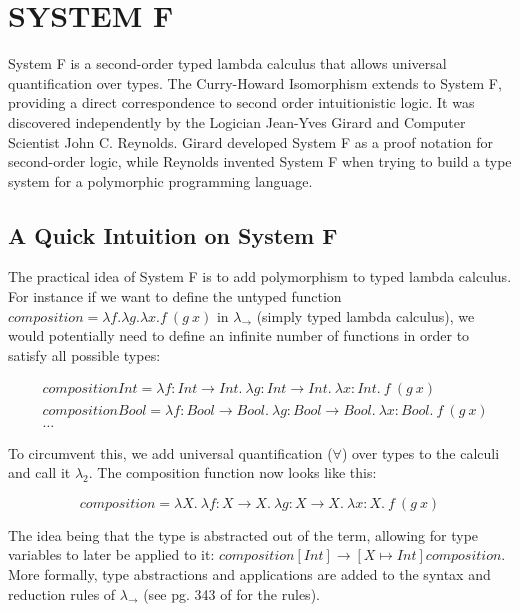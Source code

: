 \chapter{SYSTEM F} \label{ch:systemf}
System F is a second-order typed lambda calculus that allows universal quantification over types. The Curry-Howard Isomorphism extends to System F, providing a direct correspondence to second order intuitionistic logic. It was discovered independently by the Logician Jean-Yves Girard and Computer Scientist John C. Reynolds. Girard developed System F as a proof notation for second-order logic, while Reynolds invented System F when trying to build a type system for a polymorphic programming language. \cite{CHnotes}

\section{A Quick Intuition on System F}
The practical idea of System F is to add polymorphism to typed lambda calculus. For instance if we want to define the untyped function $composition = \lambda f. \lambda g. \lambda x. f\ (g\ x) $ in $\lambda_{\rightarrow} $ (simply typed lambda calculus), we would potentially need to define an infinite number of functions in order to satisfy all possible types:
\begin{spacing}{1}
\begin{equation*}
  \begin{aligned}
    & compositionInt = \lambda f:Int \rightarrow Int.\ \lambda g:Int \rightarrow Int.\ \lambda x:Int.\ f\ (g\ x) \\
    & compositionBool = \lambda f:Bool \rightarrow Bool.\ \lambda g:Bool \rightarrow Bool.\ \lambda x:Bool.\ f\ (g\ x)\\
    & \ldots
  \end{aligned}
\end{equation*}
\end{spacing}
\vspace{.1in}


To circumvent this, we add universal quantification ($\forall $) over types to the calculi and call it $\lambda_{2} $. The composition function now looks like this:
\begin{spacing}{1}
\begin{equation*}
  composition = \lambda X.\ \lambda f:X \rightarrow X.\ \lambda g:X \rightarrow X.\ \lambda x:X.\ f\ (g\ x)
\end{equation*}
\end{spacing}
\vspace{.1in}
The idea being that the type is abstracted out of the term, allowing for type variables to later be applied to it: $composition [Int] \rightarrow [X \mapsto Int] composition $. More formally, type abstractions and applications are added to the syntax and reduction rules of $\lambda_{\rightarrow} $ (see pg. 343 of \cite{tapl} for the rules).

